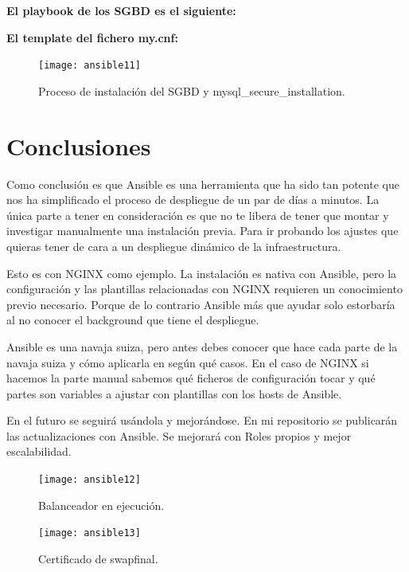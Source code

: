 \textbf{El playbook de los SGBD es el siguiente:}
\vspace{5mm}

\vspace{5mm}

\textbf{El template del fichero my.cnf:}
\vspace{5mm}

\vspace{5mm}

\begin{figure}[H]
	\centering
	\texttt{[image: ansible11]}
	\caption{Proceso de instalación del SGBD y mysql\_secure\_installation.}
\end{figure}

\newpage
\section{Conclusiones}

Como conclusión es que Ansible es una herramienta que ha sido tan potente que nos ha simplificado el proceso de despliegue de un par de días a minutos. La única parte a tener en consideración es que no te libera de tener que montar y investigar manualmente una instalación previa. Para ir probando los ajustes que quieras tener de cara a un despliegue dinámico de la infraestructura.
\vspace{5mm}

Esto es con NGINX como ejemplo. La instalación es nativa con Ansible, pero la configuración y las plantillas relacionadas con NGINX requieren un conocimiento previo necesario. Porque de lo contrario Ansible más que ayudar solo estorbaría al no conocer el background que tiene el despliegue.

Ansible es una navaja suiza, pero antes debes conocer que hace cada parte de la navaja suiza y cómo aplicarla en según qué casos. En el caso de NGINX si hacemos la parte manual sabemos qué ficheros de configuración tocar y qué partes son variables a ajustar con plantillas con los hosts de Ansible.

En el futuro se seguirá usándola y mejorándose. En mi repositorio se publicarán las actualizaciones con Ansible. Se mejorará con Roles propios y mejor escalabilidad.

\begin{figure}[H]
	\centering
	\texttt{[image: ansible12]}
	\caption{Balanceador en ejecución.}
\end{figure}

\begin{figure}[H]
	\centering
	\texttt{[image: ansible13]}
	\caption{Certificado de swapfinal.}
\end{figure}
